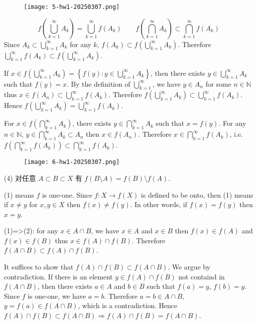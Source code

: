 \begin{figure}[H]
\centering
\texttt{[image: 5-hw1-20250307.png]}
\label{}
\end{figure}
\[
f\left( \bigcup_{k=1}^{\infty} A_k \right)=\bigcup_{k=1}^{\infty} f(A_k)\qquad f\left( \bigcap_{k=1}^{\infty} A_k \right)\subset \bigcap_{k=1}^{\infty} f(A_k)
\]
Since $A_k\subset \bigcup_{k=1}^{\infty}A_k$ for any $k$, $f(A_k)\subset f\left( \bigcup_{k=1}^{\infty}A_k \right)$. Therefore $\bigcup_{k=1}^{\infty}f(A_k)\subset f\left( \bigcup_{k=1}^{\infty}A_k \right)$.

If $x\in f\left( \bigcup_{k=1}^{\infty} A_k\right)=\left\{  f(y):y\in \bigcup_{k=1}^{\infty}A_k  \right\}$, then there exists $y\in \bigcup_{k=1}^{\infty}A_k$ such that $f(y)=x$. By the definition of $\bigcup_{k=1}^{\infty}$, we have $y\in A_n$ for some $n\in \mathbb{N}$ thus $x\in f(A_n)\subset \bigcup_{k=1}^{\infty}f(A_k)$. Therefore $f\left( \bigcup_{k=1}^{\infty}A_k \right)\subset \bigcup_{k=1}^{\infty}f(A_k)$. Hence $f\left( \bigcup_{k=1}^{\infty}A_k \right)=\bigcup_{k=1}^{\infty}f(A_k)$.

For $x\in f\left( \bigcap_{k=1}^{\infty}A_k \right)$, there exists $y\in \bigcap_{k=1}^{\infty}A_k$ such that $x=f(y)$. For any $n\in \mathbb{N}$, $y\in \bigcap_{k=1}^{\infty}A_k\subset A_n$ then $x\in f(A_n)$. Therefore $x\in \bigcap_{k=1}^{\infty }f(A_k)$, i.e. $f\left( \bigcap_{k=1}^{\infty} f(A_k)\right)\subset \bigcap_{k=1}^{\infty}f(A_k)$.

\begin{figure}[H]
\centering
\texttt{[image: 6-hw1-20250307.png]}
\label{}
\end{figure}

(4) 对任意 $A\subset B\subset X$ 有 $f (B\setminus A)=f (B)\setminus f(A)$.

(1) means $f$ is one-one. Since $f:X\to f(X)$ is defined to be onto, then (1) means if $x\neq y$ for $x, y\in X$ then $f(x)\neq f(y)$. In other words, if $f(x)=f(y)$ then $x=y$.

(1)=>(2): for any $x\in A\cap B$, we have $x\in A$ and $x\in B$ then $f (x)\in f(A)$ and $f (x)\in f(B)$ thus $x\in f(A)\cap f(B)$. Therefore $f(A\cap B)\subset f(A)\cap f(B)$.

It suffices to show that $f(A)\cap f(B)\subset f(A\cap B)$. We argue by contradiction. If there is an element $y\in f(A)\cap f(B)$ not containd in $f(A\cap B)$, then there exists $a\in A$ and $b\in B$ such that $f(a)=y$, $f(b)=y$. Since $f$ is one-one, we have $a=b$. Therefore $a=b\in A\cap B$, $y=f (a)\in f(A\cap B)$, which is a contradiction. Hence $f(A)\cap f(B)\subset f(A\cap B)\Rightarrow f(A)\cap f(B)=f(A\cap B)$.

